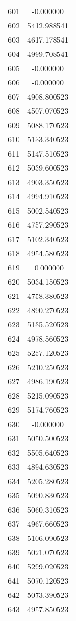 \documentclass[12pt]{article}
\begin{document}
\begin{longtable}{@{}cc@{}}
601 & -0.000000 \\
602 & 5412.988541 \\
603 & 4617.178541 \\
604 & 4999.708541 \\
605 & -0.000000 \\
606 & -0.000000 \\
607 & 4908.800523 \\
608 & 4507.070523 \\
609 & 5088.170523 \\
610 & 5133.340523 \\
611 & 5147.510523 \\
612 & 5039.600523 \\
613 & 4903.350523 \\
614 & 4994.910523 \\
615 & 5002.540523 \\
616 & 4757.290523 \\
617 & 5102.340523 \\
618 & 4954.580523 \\
619 & -0.000000 \\
620 & 5034.150523 \\
621 & 4758.380523 \\
622 & 4890.270523 \\
623 & 5135.520523 \\
624 & 4978.560523 \\
625 & 5257.120523 \\
626 & 5210.250523 \\
627 & 4986.190523 \\
628 & 5215.090523 \\
629 & 5174.760523 \\
630 & -0.000000 \\
631 & 5050.500523 \\
632 & 5505.640523 \\
633 & 4894.630523 \\
634 & 5205.280523 \\
635 & 5090.830523 \\
636 & 5060.310523 \\
637 & 4967.660523 \\
638 & 5106.090523 \\
639 & 5021.070523 \\
640 & 5299.020523 \\
641 & 5070.120523 \\
642 & 5073.390523 \\
643 & 4957.850523 \\

\end{longtable}
\end{document}
